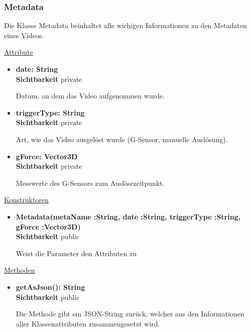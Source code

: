 \subsubsection{Metadata} \label{service:klasse:Metadata}
Die Klasse Metadata beinhaltet alle wichigen Informationen zu den Metadaten eines Videos. \newline

\underline{Attribute}
\begin{itemize}
\itemsep0pt
\item \textbf{date: String} \hfill\\ 
\textbf{Sichtbarkeit} private 

Datum, an dem das Video aufgenommen wurde.

\item \textbf{triggerType: String} \hfill\\ 
\textbf{Sichtbarkeit} private 

Art, wie das Video ausgelöst wurde (G-Sensor, manuelle Auslösung). 

\item \textbf{gForce: Vector3D} \hfill\\ 
\textbf{Sichtbarkeit} private 

Messwerte des G-Sensors zum Auslösezeitpunkt.

\end{itemize}

\underline{Konstruktoren}
\begin{itemize}
\itemsep0pt
\item \textbf{Metadata(metaName :String, date :String, triggerType :String, gForce :Vector3D)} \hfill\\
\textbf{Sichtbarkeit} public 

Weist die Parameter den Attributen zu

\end{itemize}

\underline{Methoden}
\begin{itemize}
\itemsep0pt
\item \textbf{getAsJson(): String}\hfill\\
\textbf{Sichtbarkeit} public 

Die Methode gibt ein JSON-String zurück, welcher aus den Informationen aller Klassenattributen zusammengesetzt wird.

\end{itemize}